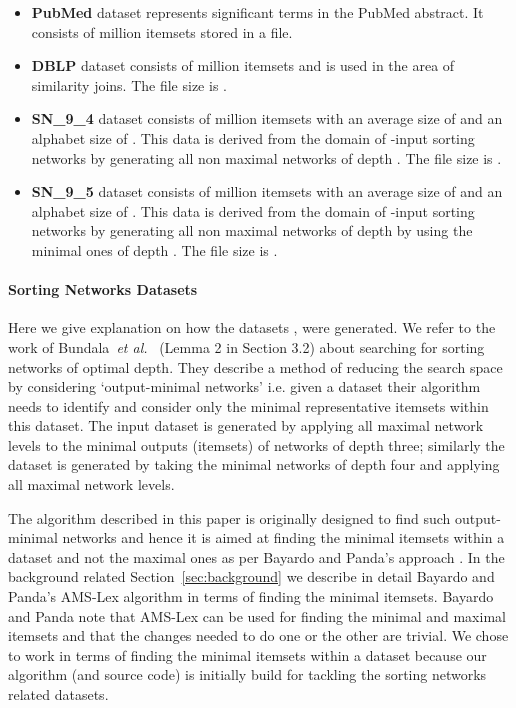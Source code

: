 \documentclass[13pt,a4paper]{article}
\begin{document}
\begin{itemize}
\item \textbf{PubMed} dataset represents significant terms in the PubMed abstract. It consists of  million itemsets stored in a  file.
\item \textbf{DBLP} dataset consists of  million itemsets and is used in the area of similarity joins. The file size is .
\item \textbf{SN\_9\_4} dataset consists of  million itemsets with an average size of  and an alphabet size of . This data is derived from the domain of -input sorting networks by generating all non maximal networks of depth  . The file size is .
\item \textbf{SN\_9\_5} dataset consists of  million itemsets with an average size of  and an alphabet size of . This data is derived from the domain of -input sorting networks by generating all non maximal networks of depth  by using the minimal ones of depth . The file size is .
\end{itemize}


\paragraph{Sorting Networks Datasets}

Here we give explanation on how the datasets ,  were generated. We refer to the work of Bundala~\textit{et al.}~\cite{BundalaCCSZ14_Optimal_Depth} (Lemma 2 in Section 3.2) about searching for sorting networks of optimal depth. They describe a method of reducing the search space by considering `output-minimal networks' i.e. given a dataset their algorithm needs to identify and consider only the minimal representative itemsets within this dataset. The input dataset  is generated by applying all maximal network levels to the minimal outputs (itemsets) of networks of depth three; similarly the dataset  is generated by taking the minimal networks of depth four and applying all maximal network levels. 

The algorithm described in this paper is originally designed to find such output-minimal networks and hence it is aimed at finding the minimal itemsets within a dataset and not the maximal ones as per Bayardo and Panda's approach \cite{BayardoPanda11}. In the background related Section~\ref{sec:background} we describe in detail Bayardo and Panda's AMS-Lex algorithm in terms of finding the minimal itemsets. Bayardo and Panda note that AMS-Lex can be used for finding the minimal and maximal itemsets and that the changes needed to do one or the other are trivial. We chose to work in terms of finding the minimal itemsets within a dataset because our algorithm (and source code) is initially build for tackling the sorting networks related datasets.
\end{document}
